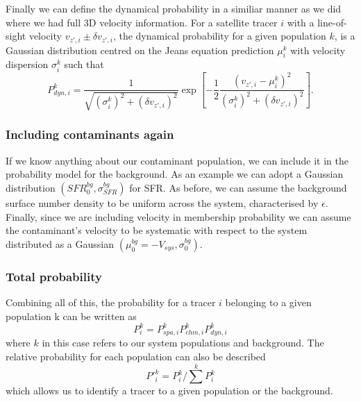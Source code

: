 Finally we can define the dynamical probability in a similiar manner as we did where we had full 3D velocity information. For a satellite tracer $i$ with a line-of-sight velocity $v_{z',i} \pm \delta v_{z',i}$, the dynamical probability for a given population $k$, is a Gaussian distribution centred on the Jeans equation prediction $\mu^k_i$ with velocity dispersion $\sigma^k_i$ such that
\begin{equation}
P^k_{dyn,i} = \frac{1}{\sqrt{(\sigma^k_i)^2+ (\delta v_{z',i})^2}} \exp{\left[-\frac{1}{2}\frac{(v_{z',i}-\mu^k_i)^2}{(\sigma^k_i)^2 + (\delta v_{z',i})^2}\right]}.
\end{equation}
\subsubsection{Including contaminants again}
If we know anything about our contaminant population, we can include it in the probability model for the background. As an example we can adopt a Gaussian distribution $(SFR_0^{bg},\sigma_{SFR}^{bg})$ for SFR. As before, we can assume the background surface number density to be uniform across the system, characterised by $\epsilon$. Finally, since we are including velocity in membership probability we can assume the contaminant's velocity to be systematic with respect to the system distributed as a Gaussian $(\mu_0^{bg}=-V_{sys},\sigma_0^{bg})$. 
\subsubsection{Total probability}
Combining all of this, the probability for a tracer $i$ belonging to a given population k can be written as
\begin{equation}
P_i^{k} = P_{spa,i}^k P_{chm,i}^k P_{dyn,i}^k 
\end{equation}
where $k$ in this case refers to our system populations and background. The relative probability for each population can also be described 
\begin{equation}
P'^k_i = P^k_i / \sum^k P^k_i
\end{equation}
which allows us to identify a tracer to a given population or the background.

